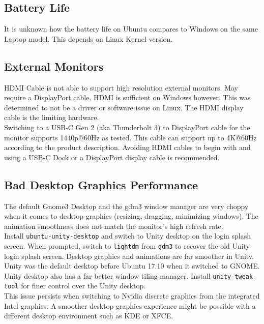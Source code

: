 \documentclass[8pt,letterpaper,twocolumn]{article}
\begin{document}
\subsection{Battery Life}

It is unknown how the battery life on Ubuntu compares to Windows on the same Laptop model. This depends on Linux Kernel version.

\subsection{External Monitors}

HDMI Cable is not able to support high resolution external monitors. May require a DisplayPort cable. HDMI is sufficient on Windows however. This was determined to not be a driver or software issue on Linux. The HDMI display cable is the limiting hardware.\\

Switching to a USB-C Gen 2 (aka Thunderbolt 3) to DisplayPort cable for the monitor supports 1440p@60Hz as tested. This cable can support up to 4K@60Hz according to the product description. Avoiding HDMI cables to begin with and using a USB-C Dock or a DisplayPort display cable is recommended.

\subsection{Bad Desktop Graphics Performance}

The default Gnome3 Desktop and the gdm3 window manager are very choppy when it comes to desktop graphics (resizing, dragging, minimizing windows). The animation smoothness does not match the monitor's high refresh rate. \\

Install \texttt{ubuntu-unity-desktop} and switch to Unity desktop on the login splash screen. When prompted, switch to \texttt{lightdm} from \texttt{gdm3} to recover the old Unity login splash screen. Desktop graphics and animations are far smoother in Unity. Unity was the default desktop before Ubuntu 17.10 when it switched to GNOME. Unity desktop also has a far better window tiling manager. Install \texttt{unity-tweak-tool} for finer control over the Unity desktop.\\

This issue persists when switching to Nvidia discrete graphics from the integrated Intel graphics. A smoother desktop graphics experience might be possible with a different desktop environment such as KDE or XFCE.
\end{document}
